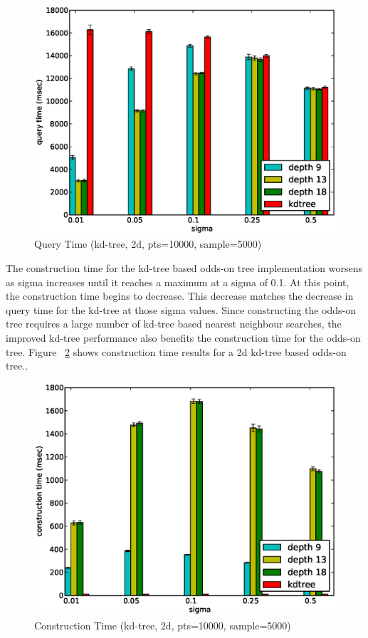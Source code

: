 \documentclass[mcs]{scsthesis}
\begin{document}
\begin{figure}
\begin{center}
\includegraphics[scale=0.5]{diagrams/2d_pts10000_sample5000_qtime.eps}
\caption{Query Time (kd-tree, 2d, pts=10000, sample=5000)}
\label{fig:sigma_qtime}
\end{center}
\end{figure}

The construction time for the kd-tree based odds-on tree implementation worsens
as sigma increases until it reaches a maximum at a sigma of 0.1. At this point,
the construction time begins to decrease. This decrease matches the decrease
in query time for the kd-tree at those sigma values. Since constructing the
odds-on tree requires a large number of kd-tree based nearest neighbour
searches, the improved kd-tree performance also benefits the construction time
for the odds-on tree. Figure ~\ref{fig:sigma_ctime} shows construction time
results for a 2d kd-tree based odds-on tree..

\begin{figure}
\begin{center}
\includegraphics[scale=0.5]{diagrams/2d_pts10000_sample5000_ctime.eps}
\caption{Construction Time (kd-tree, 2d, pts=10000, sample=5000)}
\label{fig:sigma_ctime}
\end{center}
\end{figure}
\end{document}
